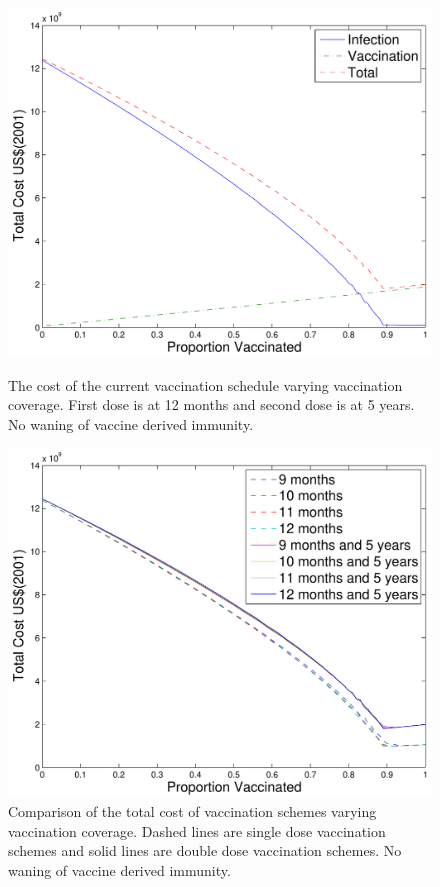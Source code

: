 \documentclass[a4paper,11pt] {scrartcl}
\begin{document}
\begin{figure}[hp]
	\centering
	\includegraphics[width=120mm]{costnowaningcurrent}
	\caption{The cost of the current vaccination schedule varying vaccination coverage. First dose is at 12 months and second dose is at 5 years. No waning of vaccine derived immunity.}
	\label{fig:resultscostnowaningcurrent}

	\includegraphics[width=120mm]{costnowaningcomparison}
	\caption{Comparison of the total cost of vaccination schemes varying vaccination coverage. Dashed lines are single dose vaccination schemes and solid lines are double dose vaccination schemes. No waning of vaccine derived immunity.}
	\label{fig:resultscostnowaningcomparison}
\end{figure}
\end{document}
